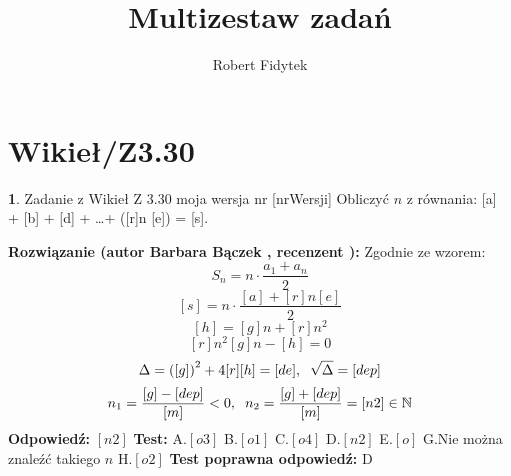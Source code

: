 \documentclass[12pt, a4paper]{article}
\title{Multizestaw zadań}
\author{Robert Fidytek}
\date{}
\theoremstyle{definition} %
\newtheorem{zad}{}
\newcommand{\kategoria}[1]{\section{#1}} %
\newcommand{\zadStart}[1]{\begin{zad}#1\newline} %
\newcommand{\zadStop}{\end{zad}}   %
\newcommand{\rozwStart}[2]{\noindent \textbf{Rozwiązanie (autor #1 , recenzent #2): }\newline} %
\newcommand{\rozwStop}{\newline}                                            %
\newcommand{\odpStart}{\noindent \textbf{Odpowiedź:}\newline}    %
\newcommand{\odpStop}{\newline}                                             %
\newcommand{\testStart}{\noindent \textbf{Test:}\newline} %
\newcommand{\testStop}{\newline} %
\newcommand{\kluczStart}{\noindent \textbf{Test poprawna odpowiedź:}\newline} %
\newcommand{\kluczStop}{\newline} %
\begin{document}
\maketitle


\kategoria{Wikieł/Z3.30}
\zadStart{Zadanie z Wikieł Z 3.30 moja wersja nr [nrWersji]}
Obliczyć $n$ z równania: [a] + [b] + [d] + \ldots + ([r]n [e]) = [s].
\zadStop
\rozwStart{Barbara Bączek}{}
Zgodnie ze wzorem:
$$S_n=n \cdot \frac{a_1+a_n}{2} $$ 
$$[s]= n \cdot \frac{[a] + [r]n [e]}{2}$$
$$[h]=[g]n + [r]n^2$$
$$[r] n^2  [g]n- [h]=0$$
$$\Delta= {([g])}^2 + 4[r][h]= [de], \hspace{0.2 cm} \sqrt{\Delta}=[dep]$$
$$n_1= \frac{[g]-[dep]}{[m]}<0 , \hspace{0.2 cm} n_2=\frac{[g]+[dep]}{[m]}=[n2] \in \mathbb{N}$$
\rozwStop
\odpStart
$[n2]$
\odpStop
\testStart
A.$[o3]$
B.$[o1]$
C.$[o4]$
D.$[n2]$
E.$[o]$
G.Nie można znaleźć takiego $n$
H.$[o2]$
\testStop
\kluczStart
D
\kluczStop
\end{document}

